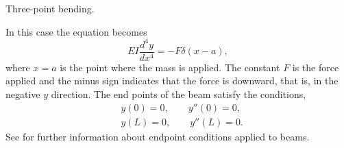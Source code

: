 \begin{myfig}
\capstart
{}
\caption{Three-point bending.\label{lt:beambendingfig}}
\end{myfig}

In this case the equation becomes
\begin{equation*}
EI \frac{d^4 y}{dx^4} = -F \delta(x-a) ,
\end{equation*}
where $x=a$ is the point where the mass is applied.  The constant $F$ is the force
applied and the minus sign indicates that the force is downward, that is, in the
negative $y$ direction.  The end points of the
beam satisfy the conditions,
\begin{align*}
& y(0) = 0, \qquad y''(0) = 0, \\
& y(L) = 0, \qquad y''(L) = 0.
\end{align*}
See  for further information about endpoint
conditions applied to beams.


